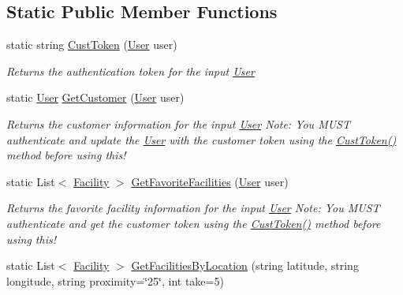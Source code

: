 \subsection*{Static Public Member Functions}
\begin{DoxyCompactItemize}
\item 
static string \mbox{\hyperlink{class_golf_now_a_p_i_1_1_golf_now_a_p_i_handler_ae2f95c14f042ab3008642f30b0b93e36}{Cust\+Token}} (\mbox{\hyperlink{class_golf_now_a_p_i_1_1_user}{User}} user)
\begin{DoxyCompactList}\small\item\em Returns the authentication token for the input \mbox{\hyperlink{class_golf_now_a_p_i_1_1_user}{User}} \end{DoxyCompactList}\item 
static \mbox{\hyperlink{class_golf_now_a_p_i_1_1_user}{User}} \mbox{\hyperlink{class_golf_now_a_p_i_1_1_golf_now_a_p_i_handler_a95bf35bea50911d71bdd8e10362a8e1a}{Get\+Customer}} (\mbox{\hyperlink{class_golf_now_a_p_i_1_1_user}{User}} user)
\begin{DoxyCompactList}\small\item\em Returns the customer information for the input \mbox{\hyperlink{class_golf_now_a_p_i_1_1_user}{User}} Note\+: You M\+U\+ST authenticate and update the \mbox{\hyperlink{class_golf_now_a_p_i_1_1_user}{User}} with the customer token using the \mbox{\hyperlink{class_golf_now_a_p_i_1_1_golf_now_a_p_i_handler_ae2f95c14f042ab3008642f30b0b93e36}{Cust\+Token()}} method before using this! \end{DoxyCompactList}\item 
static List$<$ \mbox{\hyperlink{class_golf_now_a_p_i_1_1_facility}{Facility}} $>$ \mbox{\hyperlink{class_golf_now_a_p_i_1_1_golf_now_a_p_i_handler_ad54388536fbf87a169d8fb8f7fe940e1}{Get\+Favorite\+Facilities}} (\mbox{\hyperlink{class_golf_now_a_p_i_1_1_user}{User}} user)
\begin{DoxyCompactList}\small\item\em Returns the favorite facility information for the input \mbox{\hyperlink{class_golf_now_a_p_i_1_1_user}{User}} Note\+: You M\+U\+ST authenticate and get the customer token using the \mbox{\hyperlink{class_golf_now_a_p_i_1_1_golf_now_a_p_i_handler_ae2f95c14f042ab3008642f30b0b93e36}{Cust\+Token()}} method before using this! \end{DoxyCompactList}\item 
static List$<$ \mbox{\hyperlink{class_golf_now_a_p_i_1_1_facility}{Facility}} $>$ \mbox{\hyperlink{class_golf_now_a_p_i_1_1_golf_now_a_p_i_handler_a944de1a0c317adc059274c10a7d444cd}{Get\+Facilities\+By\+Location}} (string latitude, string longitude, string proximity=\char`\"{}25\char`\"{}, int take=5)

\end{DoxyCompactItemize}
